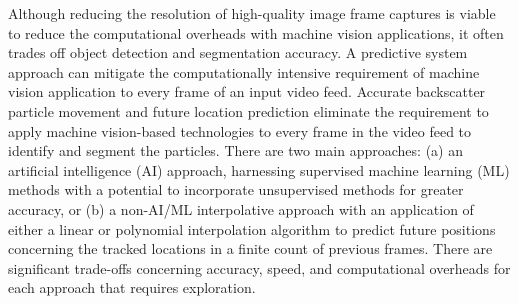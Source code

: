 Although reducing the resolution of high-quality image frame captures is viable to reduce the computational overheads with machine vision applications, it often trades off object detection and segmentation accuracy. A predictive system approach can mitigate the computationally intensive requirement of machine vision application to every frame of an input video feed. Accurate backscatter particle movement and future location prediction eliminate the requirement to apply machine vision-based technologies to every frame in the video feed to identify and segment the particles. There are two main approaches: (a) an artificial intelligence (AI) approach, harnessing supervised machine learning (ML) methods with a potential to incorporate unsupervised methods for greater accuracy, or (b) a non-AI/ML interpolative approach with an application of either a linear or polynomial interpolation algorithm to predict future positions concerning the tracked locations in a finite count of previous frames. There are significant trade-offs concerning accuracy, speed, and computational overheads for each approach that requires exploration.
